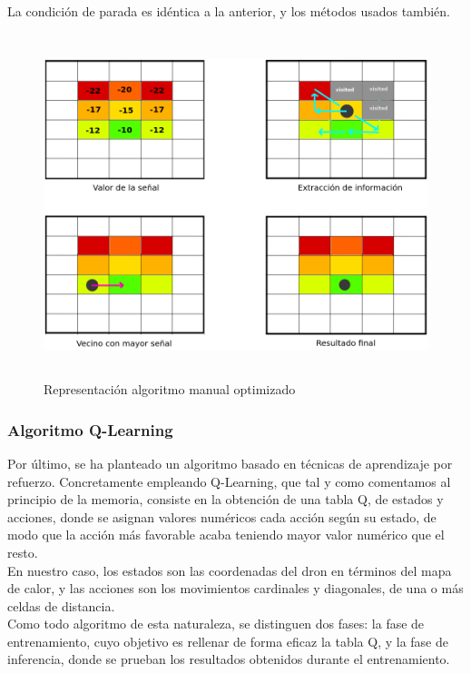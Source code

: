 La condición de parada es idéntica a la anterior, y los métodos usados también.\\

\begin{figure} [H]
    \begin{center}
    \includegraphics[height=10cm]{imagenes/cap4/10_algoritmo_optimizado.png}
    \end{center}
    \caption[Representación algoritmo manual optimizado]{Representación algoritmo manual optimizado}
    \label{fig:opt_algorithm}
\end{figure}

\subsubsection{Algoritmo Q-Learning}
\label{subsec:alg-q}

Por último, se ha planteado un algoritmo basado en técnicas de aprendizaje por refuerzo. Concretamente empleando Q-Learning, que tal y como comentamos al principio de la memoria, consiste en la obtención de una tabla Q, de estados y acciones, donde se asignan valores numéricos cada acción según su estado, de modo que la acción más favorable acaba teniendo mayor valor numérico que el resto.\\

En nuestro caso, los estados son las coordenadas del dron en términos del mapa de calor, y las acciones son los movimientos cardinales y diagonales, de una o más celdas de distancia.\\

Como todo algoritmo de esta naturaleza, se distinguen dos fases: la fase de entrenamiento, cuyo objetivo es rellenar de forma eficaz la tabla Q, y la fase de inferencia, donde se prueban los resultados obtenidos durante el entrenamiento.\\

